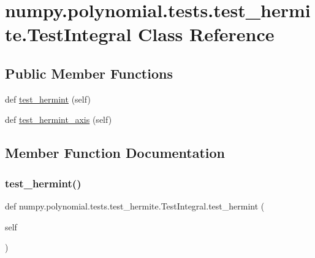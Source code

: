\hypertarget{classnumpy_1_1polynomial_1_1tests_1_1test__hermite_1_1TestIntegral}{}\section{numpy.\+polynomial.\+tests.\+test\+\_\+hermite.\+Test\+Integral Class Reference}
\label{classnumpy_1_1polynomial_1_1tests_1_1test__hermite_1_1TestIntegral}
\subsection*{Public Member Functions}
\begin{DoxyCompactItemize}
\item 
def \hyperlink{classnumpy_1_1polynomial_1_1tests_1_1test__hermite_1_1TestIntegral_aa41e3b595de1e1caf41a4f04717becdf}{test\+\_\+hermint} (self)
\item 
def \hyperlink{classnumpy_1_1polynomial_1_1tests_1_1test__hermite_1_1TestIntegral_a2e827d9987f65082b238746c4aaddbde}{test\+\_\+hermint\+\_\+axis} (self)
\end{DoxyCompactItemize}


\subsection{Member Function Documentation}
\mbox{\label{classnumpy_1_1polynomial_1_1tests_1_1test__hermite_1_1TestIntegral_aa41e3b595de1e1caf41a4f04717becdf}} 
\subsubsection{\texorpdfstring{test\+\_\+hermint()}{test\_hermint()}}
{\footnotesize\ttfamily def numpy.\+polynomial.\+tests.\+test\+\_\+hermite.\+Test\+Integral.\+test\+\_\+hermint (\begin{DoxyParamCaption}\item[{}]{self }\end{DoxyParamCaption})}

